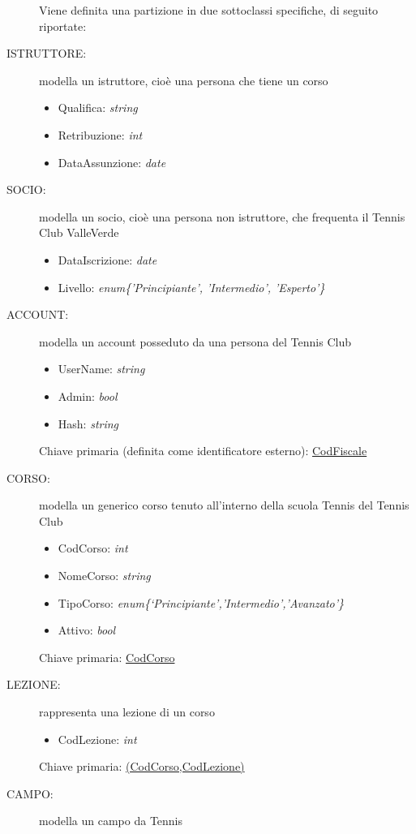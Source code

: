 \begin{description}
Viene definita una partizione in due sottoclassi specifiche, di seguito riportate:
\item[ISTRUTTORE:] modella un istruttore, cioè una persona che tiene un corso
\begin{itemize}
\item Qualifica: \textit{string} \hfill 
\item Retribuzione: \textit{int} \hfill 
\item DataAssunzione: \textit{date} \hfill 
\end{itemize}
\item[SOCIO:] modella un socio, cioè una persona non istruttore, che frequenta il Tennis Club ValleVerde
\begin{itemize}
\item DataIscrizione: \textit{date} \hfill 
\item Livello: \textit{enum\{'Principiante', 'Intermedio', 'Esperto'\}} \hfill 
\end{itemize}
\item[ACCOUNT:] modella un account posseduto da una persona del Tennis Club
\begin{itemize}
\item UserName: \textit{string} \hfill 
\item Admin: \textit{bool} \hfill 
\item Hash: \textit{string} \hfill 
\end{itemize}
Chiave primaria (definita come identificatore esterno): \underline{CodFiscale} \hfill 
\item[CORSO:] modella un generico corso tenuto all’interno della scuola Tennis del Tennis Club
\begin{itemize}
\item CodCorso: \textit{int} \hfill
\item NomeCorso: \textit{string} \hfill
\item TipoCorso: \textit{enum\{‘Principiante’,’Intermedio’,’Avanzato’\}} \hfill
\item Attivo: \textit{bool} \hfill
\end{itemize}
Chiave primaria: \underline{CodCorso} \hfill 
\item[LEZIONE:] rappresenta una lezione di un corso
\begin{itemize}
\item CodLezione: \textit{int} \hfill 
\end{itemize}
Chiave primaria: \underline{(CodCorso,CodLezione)} \hfill 
\item[CAMPO:] modella un campo da Tennis

\end{description}
